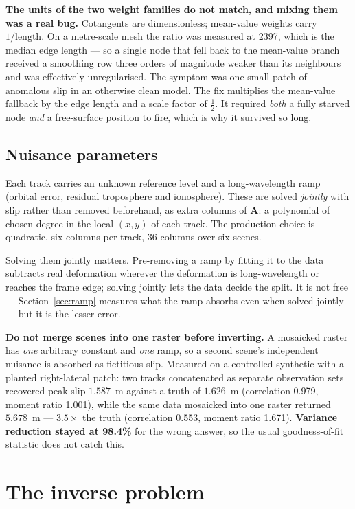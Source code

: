 \documentclass[11pt,a4paper]{article}
\newcommand{\A}{\mathbf{A}}
\newcommand{\note}[1]{\textcolor{red!60!black}{\textbf{#1}}}
\begin{document}
\note{The units of the two weight families do not match, and mixing them was a
real bug.} Cotangents are dimensionless; mean-value weights carry $1/\text{length}$.
On a metre-scale mesh the ratio was measured at 2397, which is the median edge
length --- so a single node that fell back to the mean-value branch received a
smoothing row three orders of magnitude weaker than its neighbours and was
effectively unregularised. The symptom was one small patch of anomalous slip in
an otherwise clean model. The fix multiplies the mean-value fallback by the edge
length and a scale factor of $\tfrac12$. It required \emph{both} a fully starved
node \emph{and} a free-surface position to fire, which is why it survived so long.

\subsection{Nuisance parameters}

Each track carries an unknown reference level and a long-wavelength ramp
(orbital error, residual troposphere and ionosphere). These are solved
\emph{jointly} with slip rather than removed beforehand, as extra columns of
$\A$: a polynomial of chosen degree in the local $(x,y)$ of each track. The
production choice is quadratic, six columns per track, 36 columns over six
scenes.

Solving them jointly matters. Pre-removing a ramp by fitting it to the data
subtracts real deformation wherever the deformation is long-wavelength or reaches
the frame edge; solving jointly lets the data decide the split. It is not free
--- Section~\ref{sec:ramp} measures what the ramp absorbs even when solved
jointly --- but it is the lesser error.

\note{Do not merge scenes into one raster before inverting.} A mosaicked raster
has \emph{one} arbitrary constant and \emph{one} ramp, so a second scene's
independent nuisance is absorbed as fictitious slip. Measured on a controlled
synthetic with a planted right-lateral patch: two tracks concatenated as separate
observation sets recovered peak slip $1.587$~m against a truth of $1.626$~m
(correlation 0.979, moment ratio 1.001), while the same data mosaicked into one
raster returned $5.678$~m --- $3.5\times$ the truth (correlation 0.553, moment
ratio 1.671). \textbf{Variance reduction stayed at 98.4\%} for the wrong answer,
so the usual goodness-of-fit statistic does not catch this.

\section{The inverse problem}
\end{document}
